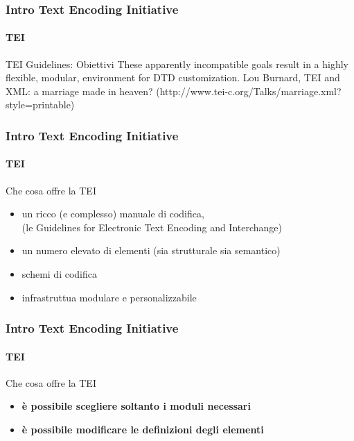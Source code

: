 \begin{frame}
	\frametitle{Intro Text Encoding Initiative}
	\framesubtitle{TEI}
	\addtocounter{nframe}{1}

	\begin{block}{TEI Guidelines: Obiettivi}
		These apparently incompatible goals result in a highly flexible,
		modular, environment for DTD customization.
		Lou Burnard, TEI and XML: a marriage made in heaven?
		(http://www.tei-c.org/Talks/marriage.xml?style=printable)
	\end{block}

\end{frame}


\begin{frame}
	\frametitle{Intro Text Encoding Initiative}
	\framesubtitle{TEI}
	\addtocounter{nframe}{1}

	\begin{block}{Che cosa offre la TEI}
        \begin{itemize}
            \item un ricco (e complesso) manuale di codifica, 
            \\(le Guidelines for Electronic Text Encoding and Interchange)
            \item un numero elevato di elementi (sia strutturale sia semantico)
            \item schemi di codifica
            \item infrastruttua modulare e personalizzabile
        \end{itemize}

	\end{block}

\end{frame}

\begin{frame}
	\frametitle{Intro Text Encoding Initiative}
	\framesubtitle{TEI}
	\addtocounter{nframe}{1}

	\begin{block}{Che cosa offre la TEI}
		\begin{itemize}
			\item \textbf{è possibile scegliere soltanto i moduli necessari}
			\item \textbf{è possibile modificare le definizioni degli elementi}
		\end{itemize}

	\end{block}

\end{frame}

